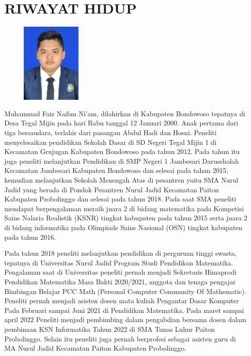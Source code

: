 \newpage
\chapter*{RIWAYAT HIDUP}

\noindent
\begin{figure}
\includegraphics[width=3cm, height=4cm]{Gambar/pas foto.jpg} 
\end{figure}

Muhammad Faiz Nailun Ni'am, dilahirkan di Kabupaten Bondowoso tepatnya di Desa Tegal Mijin pada hari Rabu tanggal 12 Januari 2000. Anak pertama dari tiga bersaudara, terlahir dari pasangan Abdul Hadi dan Hosni. Peneliti menyelesaikan pendidikan Sekolah Dasar di SD Negeri Tegal Mijin 1 di Kecamatan Grujugan Kabupaten Bondowoso pada tahun 2012. Pada tahun itu juga peneliti melanjutkan Pendidikan di SMP Negeri 1 Jambesari Darussholah Kecamatan Jambesari Kabupaten Bondowoso dan selesai pada tahun 2015, kemudian melanjutkan Sekolah Menengah Atas di pesantren yaitu SMA Nurul Jadid yang berada di Pondok Pesantren Nurul Jadid Kecamatan Paiton Kabupaten Probolinggo dan selesai pada tahun 2018. Pada saat SMA peneliti mendapat berpengalaman meraih juara 2 di bidang matematika pada Kompetisi Sains Nalaria Realistik (KSNR) tingkat kabupaten pada tahun 2015 serta juara 2 di bidang informatika pada Olimpiade Sains Nasional (OSN) tingkat kabupaten pada tahun 2016.

Pada tahun 2018 peneliti melanjutkan pendidikan di perguruan tinggi swasta, tepatnya di Universitas Nurul Jadid Program Studi Pendidikan Matematika. Pengalaman saat di Universitas peneliti pernah menjadi Sekretaris Himaprodi Pendidikan Matematika Masa Bakti 2020/2021, anggota dan tenaga pengajar Bimbingan Belajar PCC Math (Personal Computer Community Of Mathematic). Peneliti pernah menjadi asisten dosen mata kuliah Pengantar Dasar Komputer Pada Februari sampai Juni 2021 di Pendidikan Matematika. Pada maret sampai april 2022 Peneliti menjadi pembimbing dalam pengabdian bersama dosen dalam pembinaan KSN Informatika Tahun 2022 di SMA Tunas Luhur Paiton Probolinggo. Selain itu peneliti juga pernah berprofesi sebagai asisten guru di MA Nurul Jadid Kecamatan Paiton Kabupaten Probolinggo. 